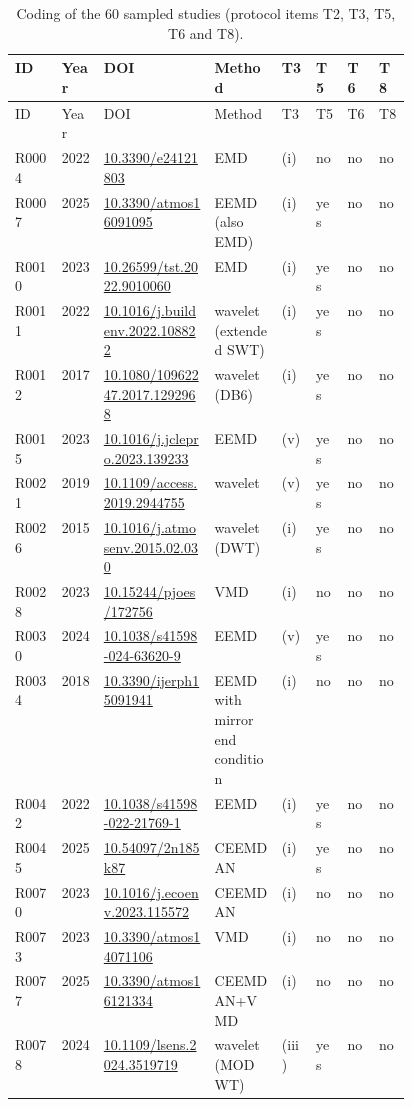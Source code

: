 \setlength{\LTleft}{0pt}
\setlength{\LTright}{0pt}
\scriptsize
\begin{longtable}{llp{0.29\linewidth}p{0.17\linewidth}llll}
\caption{Coding of the 60 sampled studies (protocol items T2, T3, T5, T6 and T8).}\label{tab:s_lit_coding}\\
\toprule
ID & Year & DOI & Method & T3 & T5 & T6 & T8 \\
\midrule
\endfirsthead
\toprule
ID & Year & DOI & Method & T3 & T5 & T6 & T8 \\
\midrule
\endhead
R0004 & 2022 & \url{10.3390/e24121803} & EMD & (i) & no & no & no \\
R0007 & 2025 & \url{10.3390/atmos16091095} & EEMD (also EMD) & (i) & yes & no & no \\
R0010 & 2023 & \url{10.26599/tst.2022.9010060} & EMD & (i) & yes & no & no \\
R0011 & 2022 & \url{10.1016/j.buildenv.2022.108822} & wavelet (extended SWT) & (i) & yes & no & no \\
R0012 & 2017 & \url{10.1080/10962247.2017.1292968} & wavelet (DB6) & (i) & yes & no & no \\
R0015 & 2023 & \url{10.1016/j.jclepro.2023.139233} & EEMD & (v) & yes & no & no \\
R0021 & 2019 & \url{10.1109/access.2019.2944755} & wavelet & (v) & yes & no & no \\
R0026 & 2015 & \url{10.1016/j.atmosenv.2015.02.030} & wavelet (DWT) & (i) & yes & no & no \\
R0028 & 2023 & \url{10.15244/pjoes/172756} & VMD & (i) & no & no & no \\
R0030 & 2024 & \url{10.1038/s41598-024-63620-9} & EEMD & (v) & yes & no & no \\
R0034 & 2018 & \url{10.3390/ijerph15091941} & EEMD with mirror end condition & (i) & no & no & no \\
R0042 & 2022 & \url{10.1038/s41598-022-21769-1} & EEMD & (i) & yes & no & no \\
R0045 & 2025 & \url{10.54097/2n185k87} & CEEMDAN & (i) & yes & no & no \\
R0070 & 2023 & \url{10.1016/j.ecoenv.2023.115572} & CEEMDAN & (i) & no & no & no \\
R0073 & 2023 & \url{10.3390/atmos14071106} & VMD & (i) & no & no & no \\
R0077 & 2025 & \url{10.3390/atmos16121334} & CEEMDAN+VMD & (i) & no & no & no \\
R0078 & 2024 & \url{10.1109/lsens.2024.3519719} & wavelet (MODWT) & (iii) & yes & no & no \\

\end{longtable}
